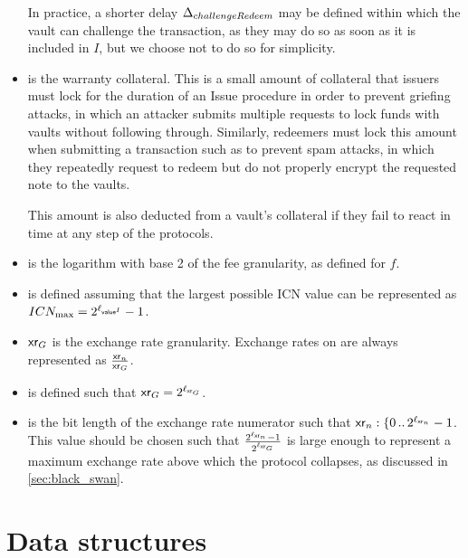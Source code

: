 \begin{itemize}
    In practice, a shorter delay $\Delta_{challengeRedeem}$ may be defined within which the vault can challenge the \burn transaction, as they may do so as soon as it is included in $I$, but we choose not to do so for simplicity.
    
    \item \iw is the warranty collateral.
    This is a small amount of collateral that issuers must lock for the duration of an Issue procedure in order to prevent griefing attacks, in which an attacker submits multiple requests to lock funds with vaults without following through.
    Similarly, redeemers must lock this amount when submitting a \burn transaction such as to prevent spam attacks, in which they repeatedly request to redeem but do not properly encrypt the requested note to the vaults.
    
    This amount is also deducted from a vault's collateral if they fail to react in time at any step of the protocols.
    
    \item \lf is the logarithm with base 2 of the fee granularity, as defined for $f$.
    
    \item \lvalueI is defined assuming that the largest possible ICN value can be represented as $ICN_{\max} = 2^{\ell_{\mathsf{value}^I}}-1$.
    
    \item $\mathsf{xr}_G$ is the exchange rate granularity.
     Exchange rates on \zclaim are always represented as $\frac{\mathsf{xr}_n}{\mathsf{xr}_G}$.
    
    \item \lxrG is defined such that $\mathsf{xr}_G = 2^{\ell_{\mathsf{xr}_G}}$.

    \item \lxrn is the bit length of the exchange rate numerator such that $\mathsf{xr}_n : \{0\,..\,2^{\ell_{\mathsf{xr}_n}}-1$.
    This value should be chosen such that $\frac{2^{\ell_{\mathsf{xr}_n}}-1}{2^{\ell_{\mathsf{xr}_G}}}$ is large enough to represent a maximum exchange rate above which the protocol collapses, as discussed in \cref{sec:black_swan}.
\end{itemize}


\section{Data structures}

